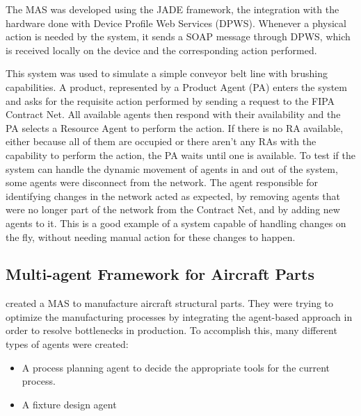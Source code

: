 The MAS was developed using the JADE framework, the integration with the hardware done with Device Profile Web Services (DPWS). Whenever a physical action is needed by the system, it sends a SOAP message through DPWS, which is received locally on the device and the corresponding action performed.

This system was used to simulate a simple conveyor belt line with brushing capabilities. A product, represented by a Product Agent (PA) enters the system and asks for the requisite action performed by sending a request to the FIPA Contract Net. All available agents then respond with their availability and the PA selects a Resource Agent to perform the action. If there is no RA available, either because all of them are occupied or there aren't any RAs with the capability to perform the action, the PA waits until one is available.
To test if the system can handle the dynamic movement of agents in and out of the system, some agents were disconnect from the network. The agent responsible for identifying changes in the network acted as expected, by removing agents that were no longer part of the network from the Contract Net, and by adding new agents to it.
This is a good example of a system capable of handling changes on the fly, without needing manual action for these changes to happen.

\subsection{Multi-agent Framework for Aircraft Parts}

\citeauthor{6221793} \cite{6221793} created a MAS to manufacture aircraft structural parts. They were trying to optimize the manufacturing processes by integrating the agent-based approach in order to resolve bottlenecks in production. To accomplish this, many different types of agents were created:

\begin{itemize}
	\item A process planning agent to decide the appropriate tools for the current process.
	\item A fixture design agent 
\end{itemize}